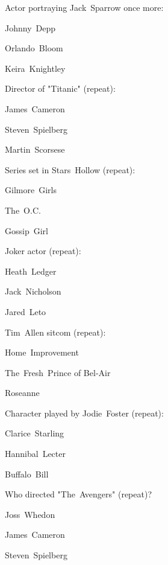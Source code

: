 \begin{enhancedmcq}{Actor portraying Jack Sparrow once more:}
\item Johnny Depp
\item Orlando Bloom
\item Keira Knightley

\end{enhancedmcq}
\begin{enhancedmcq}{Director of "Titanic" (repeat):}
\item James Cameron
\item Steven Spielberg
\item Martin Scorsese

\end{enhancedmcq}
\begin{enhancedmcq}{Series set in Stars Hollow (repeat):}
\item Gilmore Girls
\item The O.C.
\item Gossip Girl

\end{enhancedmcq}
\begin{enhancedmcq}{Joker actor (repeat):}
\item Heath Ledger
\item Jack Nicholson
\item Jared Leto

\end{enhancedmcq}
\begin{enhancedmcq}{Tim Allen sitcom (repeat):}
\item Home Improvement
\item The Fresh Prince of Bel‑Air
\item Roseanne

\end{enhancedmcq}
\begin{enhancedmcq}{Character played by Jodie Foster (repeat):}
\item Clarice Starling
\item Hannibal Lecter
\item Buffalo Bill

\end{enhancedmcq}
\begin{enhancedmcq}{Who directed "The Avengers" (repeat)?}
\item Joss Whedon
\item James Cameron
\item Steven Spielberg

\end{enhancedmcq}
